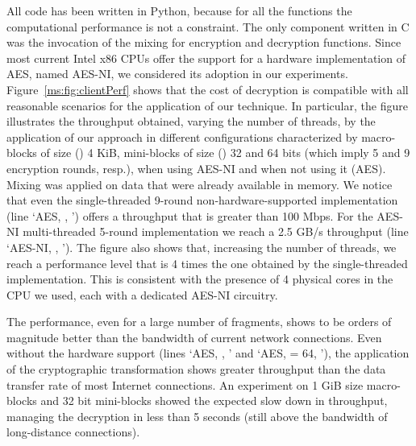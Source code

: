 All code has been written in Python, because for all the functions the computational performance is not a constraint. The only component written in C was the invocation of the mixing for encryption and decryption functions. Since most current Intel x86 CPUs offer the support for a hardware implementation of AES, named AES-NI, we considered its adoption in our experiments. Figure~\ref{ms:fig:clientPerf} shows that the cost of decryption is compatible with all reasonable scenarios for the application of our technique. In particular, the figure illustrates the throughput obtained, varying the number of threads, by the application of our approach in different configurations characterized by macro-blocks of size (\Msize) 4 KiB, mini-blocks of size (\msize) 32 and 64 bits (which imply 5 and 9 encryption rounds, resp.), when using AES-NI and when not using it (AES). Mixing was applied on data that were already available in memory. We notice that even the single-threaded 9-round non-hardware-supported implementation (line `AES, , ') offers a throughput that is greater than 100 Mbps. For the AES-NI multi-threaded 5-round implementation we reach a 2.5 GB/s throughput (line `AES-NI, , '). The figure also shows that, increasing the number of threads, we reach a performance level that is 4 times the one obtained by the single-threaded implementation. This is consistent with the presence of 4 physical cores in the CPU we used, each with a dedicated AES-NI circuitry.

The performance, even for a large number of fragments, shows to be orders of magnitude better than the bandwidth of current network connections. Even without the hardware support (lines `AES, , ' and `AES, \msize= 64, '), the application of the cryptographic transformation shows greater throughput than the data transfer rate of most Internet connections. An experiment on 1 GiB size macro-blocks and 32 bit mini-blocks showed the expected slow down in throughput, managing the decryption in less than 5 seconds (still above the bandwidth of long-distance connections).


